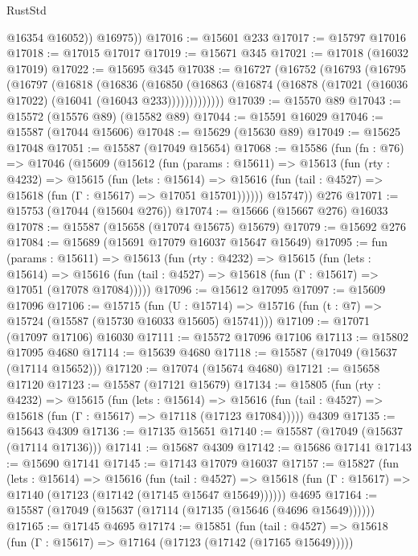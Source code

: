 \begin{lexlean}{RustStd}
\begin{coremodule}
            @16354
            @16052))
        @16975))
@17016 := @15601 @233
@17017 := @15797 @17016
@17018 := @17015 @17017
@17019 := @15671 @345
@17021 := @17018 (@16032 @17019)
@17022 := @15695 @345
@17038 := @16727
    (@16752
      (@16793
        (@16795
          (@16797
            (@16818
              (@16836
                (@16850
                  (@16863 (@16874 (@16878 (@17021 (@16036 @17022) (@16041 (@16043 @233)))))))))))))
@17039 := @15570 @89
@17043 := @15572 (@15576 @89) (@15582 @89)
@17044 := @15591 @16029
@17046 := @15587 (@17044 @15606)
@17048 := @15629 (@15630 @89)
@17049 := @15625 @17048
@17051 := @15587 (@17049 @15654)
@17068 := @15586
    (fun (fn : @76) =>
    @17046
      (@15609
        (@15612
          (fun (params : @15611) =>
          @15613
            (fun (rty : @4232) =>
            @15615
              (fun (lets : @15614) =>
              @15616 (fun (tail : @4527) => @15618 (fun (Γ : @15617) => @17051 @15701))))))
        @15747))
    @276
@17071 := @15753 (@17044 (@15604 @276))
@17074 := @15666 (@15667 @276) @16033
@17078 := @15587 (@15658 (@17074 @15675) @15679)
@17079 := @15692 @276
@17084 := @15689 (@15691 @17079 @16037 @15647 @15649)
@17095 := fun (params : @15611) =>
  @15613
    (fun (rty : @4232) =>
    @15615
      (fun (lets : @15614) =>
      @15616 (fun (tail : @4527) => @15618 (fun (Γ : @15617) => @17051 (@17078 @17084)))))
@17096 := @15612 @17095
@17097 := @15609 @17096
@17106 := @15715
    (fun (U : @15714) => @15716 (fun (t : @7) => @15724 (@15587 (@15730 @16033 @15605) @15741)))
@17109 := @17071 (@17097 @17106) @16030
@17111 := @15572 @17096 @17106
@17113 := @15802 @17095 @4680
@17114 := @15639 @4680
@17118 := @15587 (@17049 (@15637 (@17114 @15652)))
@17120 := @17074 (@15674 @4680)
@17121 := @15658 @17120
@17123 := @15587 (@17121 @15679)
@17134 := @15805
    (fun (rty : @4232) =>
    @15615
      (fun (lets : @15614) =>
      @15616 (fun (tail : @4527) => @15618 (fun (Γ : @15617) => @17118 (@17123 @17084)))))
    @4309
@17135 := @15643 @4309
@17136 := @17135 @15651
@17140 := @15587 (@17049 (@15637 (@17114 @17136)))
@17141 := @15687 @4309
@17142 := @15686 @17141
@17143 := @15690 @17141
@17145 := @17143 @17079 @16037
@17157 := @15827
    (fun (lets : @15614) =>
    @15616
      (fun (tail : @4527) =>
      @15618 (fun (Γ : @15617) => @17140 (@17123 (@17142 (@17145 @15647 @15649))))))
    @4695
@17164 := @15587 (@17049 (@15637 (@17114 (@17135 (@15646 (@4696 @15649))))))
@17165 := @17145 @4695
@17174 := @15851
    (fun (tail : @4527) => @15618 (fun (Γ : @15617) => @17164 (@17123 (@17142 (@17165 @15649)))))

\end{coremodule}
\end{lexlean}
